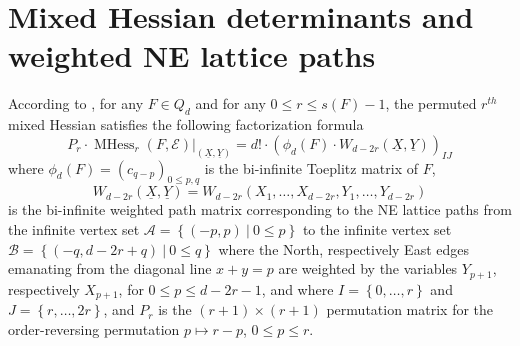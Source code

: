 \documentclass[unnumsec,webpdf,modern,medium]{oup-authoring-template}
\theoremstyle{theorem}
\theoremstyle{definition}
\begin{document}
\section{Mixed Hessian determinants and weighted NE lattice paths}
\label{sec:MixedHessians}
According to \cite[Lemma 4.19]{MMS}, for any $F\in Q_d$ and for any $0\leq r\leq s(F)-1$, the permuted $r^{th}$ mixed Hessian satisfies the following factorization formula
\begin{equation}
	\label{eq:factor}
	P_r\cdot \operatorname{MHess}_r(F,\mathcal{E})|_{(\underline{X},\underline{Y})}=d!\cdot \left(\phi_d(F)\cdot W_{d-2r}(\underline{X},\underline{Y})\right)_{IJ}	
\end{equation}
where $\phi_d(F)=(c_{q-p})_{0\leq p,q}$ is the bi-infinite Toeplitz matrix of $F$, $$W_{d-2r}(\underline{X},\underline{Y})=W_{d-2r}(X_1,\ldots,X_{d-2r},Y_1,\ldots,Y_{d-2r})$$ is the bi-infinite weighted path matrix corresponding to the NE lattice paths from the infinite vertex set $\mathcal{A}=\left\{(-p,p) \ | \ 0\leq p\right\}$ to the infinite vertex set $\mathcal{B}=\left\{(-q,d-2r+q) \ | \ 0\leq q\right\}$ where the North, respectively East edges emanating from the diagonal line $x+y=p$ are weighted by the variables $Y_{p+1}$, respectively $X_{p+1}$, for $0\leq p\leq d-2r-1$, and where $I=\left\{0,\ldots,r\right\}$ and $J=\left\{r,\ldots,2r\right\}$, and $P_r$ is the $(r+1)\times (r+1)$ permutation matrix for the order-reversing permutation $p\mapsto r-p$, $0\leq p\leq r$.  
\end{document}
